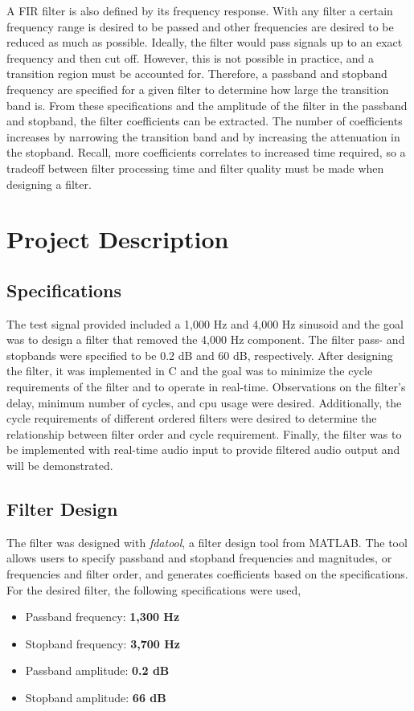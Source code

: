 \documentclass[11pt,pdftex,portrait,letterpaper]{article}
\begin{document}
A FIR filter is also defined by its frequency response. With any filter a certain frequency range is desired to be passed and other frequencies are desired to be reduced as much as possible. Ideally, the filter would pass signals up to an exact frequency and then cut off. However, this is not possible in practice, and a transition region must be accounted for. Therefore, a passband and stopband frequency are specified for a given filter to determine how large the transition band is. From these specifications and the amplitude of the filter in the passband and stopband, the filter coefficients can be extracted. The number of coefficients increases by narrowing the transition band and by increasing the attenuation in the stopband. Recall, more coefficients correlates to increased time required, so a tradeoff between filter processing time and filter quality must be made when designing a filter. 

\section{Project Description}

\subsection{Specifications}

The test signal provided included a 1,000 Hz and 4,000 Hz sinusoid and the goal was to design a filter that removed the 4,000 Hz component. The filter pass- and stopbands were specified to be 0.2 dB and 60 dB, respectively. After designing the filter, it was implemented in C and the goal was to minimize the cycle requirements of the filter and to operate in real-time. Observations on the filter's delay, minimum number of cycles, and cpu usage were desired. Additionally, the cycle requirements of different ordered filters were desired to determine the relationship between filter order and cycle requirement. Finally, the filter was to be implemented with real-time audio input to provide filtered audio output and will be demonstrated. 

\subsection{Filter Design}

The filter was designed with \textit{fdatool}, a filter design tool from MATLAB. The tool allows users to specify passband and stopband frequencies and magnitudes, or frequencies and filter order, and generates coefficients based on the specifications. For the desired filter, the following specifications were used,
\begin{itemize}
\item Passband frequency:  \textbf{1,300 Hz}
\item Stopband frequency:  \textbf{3,700 Hz}
\item Passband amplitude:  \textbf{0.2 dB}
\item Stopband amplitude:  \textbf{66 dB}
\end{itemize}
\end{document}
